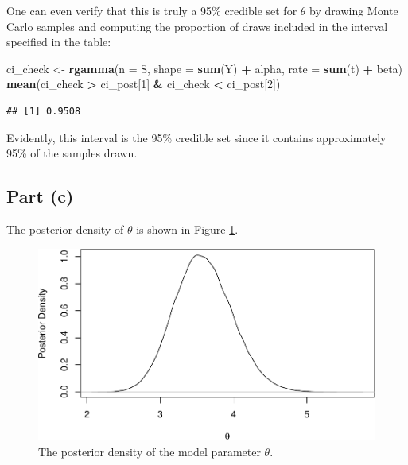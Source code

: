 \documentclass[
]{homework}
\newenvironment{Shaded}{\begin{snugshade}}{\end{snugshade}}
\newcommand{\AttributeTok}[1]{\textcolor[rgb]{0.13,0.29,0.53}{#1}}
\newcommand{\DecValTok}[1]{\textcolor[rgb]{0.00,0.00,0.81}{#1}}
\newcommand{\FunctionTok}[1]{\textcolor[rgb]{0.13,0.29,0.53}{\textbf{#1}}}
\newcommand{\NormalTok}[1]{#1}
\newcommand{\OtherTok}[1]{\textcolor[rgb]{0.56,0.35,0.01}{#1}}
\newcommand{\SpecialCharTok}[1]{\textcolor[rgb]{0.81,0.36,0.00}{\textbf{#1}}}
\begin{document}
One can even verify that this is truly a 95\% credible set for \(\theta\) by drawing Monte Carlo samples and computing the proportion of draws included in the interval specified in the table:

\begin{Shaded}
\begin{Highlighting}[]
\NormalTok{ci\_check }\OtherTok{\textless{}{-}} \FunctionTok{rgamma}\NormalTok{(}\AttributeTok{n =}\NormalTok{ S, }\AttributeTok{shape =} \FunctionTok{sum}\NormalTok{(Y) }\SpecialCharTok{+}\NormalTok{ alpha, }\AttributeTok{rate =} \FunctionTok{sum}\NormalTok{(t) }\SpecialCharTok{+}\NormalTok{ beta)}
\FunctionTok{mean}\NormalTok{(ci\_check }\SpecialCharTok{\textgreater{}}\NormalTok{ ci\_post[}\DecValTok{1}\NormalTok{] }\SpecialCharTok{\&}\NormalTok{ ci\_check }\SpecialCharTok{\textless{}}\NormalTok{ ci\_post[}\DecValTok{2}\NormalTok{])}
\end{Highlighting}
\end{Shaded}

\begin{verbatim}
## [1] 0.9508
\end{verbatim}

Evidently, this interval is the 95\% credible set since it contains approximately 95\% of the samples drawn.

\subsection{Part (c)}\label{part-c}

The posterior density of \(\theta\) is shown in Figure \ref{fig:ex1-post-density-theta}.

\begin{figure}

{\centering \includegraphics[width=0.75\linewidth]{finalexam_files/figure-latex/ex1-post-density-theta-1} 

}

\caption{The posterior density of the model parameter $\theta$.}\label{fig:ex1-post-density-theta}
\end{figure}
\end{document}
